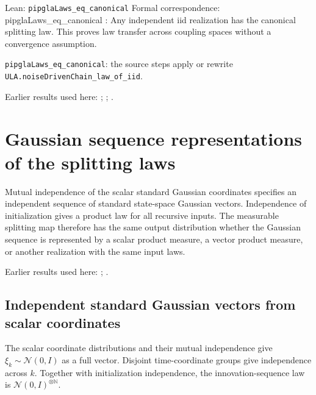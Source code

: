 \documentclass[11pt,a4paper]{report}
\begin{document}
\begin{leanbox}{Lean: \texttt{pipglaLaws\_\allowbreak{}eq\_\allowbreak{}canonical}}
Formal correspondence: pipglaLaws\_eq\_canonical : Any independent iid realization has the canonical splitting law. This proves law transfer across coupling spaces without a convergence assumption.



\texttt{pipgla\allowbreak{}Laws\_\allowbreak{}eq\_\allowbreak{}canonical}: the source steps apply or rewrite \texttt{ULA.\allowbreak{}noise\allowbreak{}Driven\allowbreak{}Chain\_\allowbreak{}law\_\allowbreak{}of\_\allowbreak{}iid}.
\end{leanbox}


Earlier results used here: \cite[Section~3.20.5]{LangevinLean2026ULASC}; \cite[Section~3.20.8]{LangevinLean2026ULASC}; \cite[Section~3.1.1]{LangevinLean2026IPLA}.
\section{\texorpdfstring{Gaussian sequence representations of the splitting laws}{Gaussian sequence representations of the splitting laws}}
\label{proof-module-ProximalLangevin-SplittingGaussianLaw-lean}


Mutual independence of the scalar standard Gaussian coordinates specifies an independent sequence of standard state-space Gaussian vectors. Independence of initialization gives a product law for all recursive inputs. The measurable splitting map therefore has the same output distribution whether the Gaussian sequence is represented by a scalar product measure, a vector product measure, or another realization with the same input laws.



Earlier results used here: \cite[Section~3.15]{LangevinLean2026IPLA}; \cite[Section~3.41]{LangevinLean2026ULASC}.
\subsection{\texorpdfstring{Independent standard Gaussian vectors from scalar coordinates}{Independent standard Gaussian vectors from scalar coordinates}}
\label{report-step-ProximalLangevin-SplittingGaussianLaw-lean-1}


The scalar coordinate distributions and their mutual independence give \(\xi_k\sim\mathcal N(0,I)\) as a full vector. Disjoint time-coordinate groups give independence across \(k\). Together with initialization independence, the innovation-sequence law is \(\mathcal N(0,I)^{\otimes\mathbb N}\).
\end{document}
